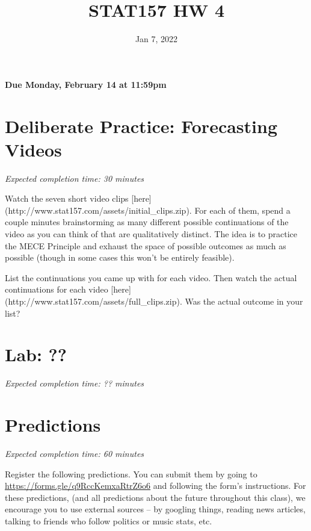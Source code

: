 \documentclass[11pt]{article}
\title{STAT157 HW 4}
\date{Jan 7, 2022}
\begin{document}
\maketitle

\hfill \textbf{Due Monday, February 14 at 11:59pm}

\section*{Deliberate Practice: Forecasting Videos}

\emph{Expected completion time: 30 minutes}

Watch the seven short video clips [here](http://www.stat157.com/assets/initial_clips.zip). For each of them, spend a couple minutes brainstorming as many different possible continuations of the video as you can think of that are qualitatively distinct. The idea is to practice the MECE Principle and exhaust the space of possible outcomes as much as possible (though in some cases this won't be entirely feasible).

List the continuations you came up with for each video. Then watch the actual continuations for each video [here](http://www.stat157.com/assets/full_clips.zip). Was the actual outcome in your list?

\section*{Lab: ??}

\emph{Expected completion time: ?? minutes}

\section*{Predictions}

\emph{Expected completion time: 60 minutes}

Register the following predictions. You can submit them by going to \url{https://forms.gle/q9RccKemxaRtrZ6o6} and following the form's instructions. For these predictions, (and all predictions about the future throughout this class), we encourage you to use external sources -- by googling things, reading news articles, talking to friends who follow politics or music stats, etc.
\end{document}
